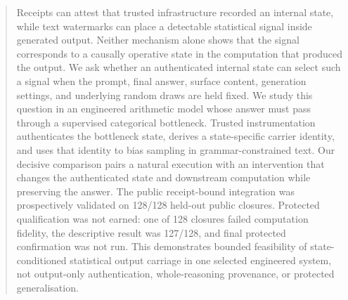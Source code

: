 \begin{abstract}
Receipts can attest that trusted infrastructure recorded an internal state, while
text watermarks can place a detectable statistical signal inside generated
output. Neither mechanism alone shows that the signal corresponds to a
causally operative state in the computation that produced the output. We ask
whether an authenticated internal state can select such a signal when the
prompt, final answer, surface content, generation settings, and underlying
random draws are held fixed. We study this question in an engineered arithmetic
model whose answer must pass through a supervised categorical bottleneck.
Trusted instrumentation authenticates the bottleneck state, derives a
state-specific carrier identity, and uses that identity to bias sampling in
grammar-constrained text. Our decisive comparison pairs a natural execution
with an intervention that changes the authenticated state and downstream
computation while preserving the answer. The public receipt-bound integration
was prospectively validated on 128/128 held-out public closures. Protected
qualification was not earned: one of 128 closures failed computation fidelity,
the descriptive result was 127/128, and final protected confirmation was not
run. This demonstrates bounded feasibility of state-conditioned statistical
output carriage in one selected engineered system, not output-only
authentication, whole-reasoning provenance, or protected generalisation.
\end{abstract}
